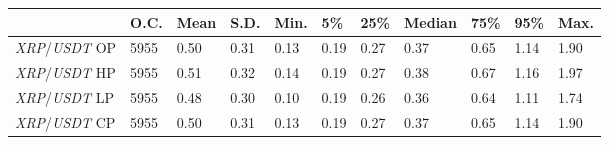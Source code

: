 \begin{tabular}{lllllllllll}
\toprule
 & \textbf{O.C.} & \textbf{Mean} & \textbf{S.D.} & \textbf{Min.} & \textbf{5\%} & \textbf{25\%} & \textbf{Median} & \textbf{75\%} & \textbf{95\%} & \textbf{Max.} \\
\midrule
\emph{XRP}/\emph{USDT} OP & 5955 & 0.50 & 0.31 & 0.13 & 0.19 & 0.27 & 0.37 & 0.65 & 1.14 & 1.90 \\
\emph{XRP}/\emph{USDT} HP & 5955 & 0.51 & 0.32 & 0.14 & 0.19 & 0.27 & 0.38 & 0.67 & 1.16 & 1.97 \\
\emph{XRP}/\emph{USDT} LP & 5955 & 0.48 & 0.30 & 0.10 & 0.19 & 0.26 & 0.36 & 0.64 & 1.11 & 1.74 \\
\emph{XRP}/\emph{USDT} CP & 5955 & 0.50 & 0.31 & 0.13 & 0.19 & 0.27 & 0.37 & 0.65 & 1.14 & 1.90 \\
\bottomrule
\end{tabular}
